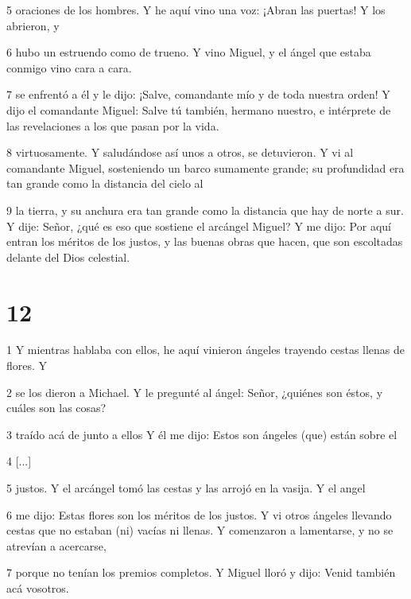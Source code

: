 \par 5 oraciones de los hombres. Y he aquí vino una voz: ¡Abran las puertas! Y los abrieron, y

\par 6 hubo un estruendo como de trueno. Y vino Miguel, y el ángel que estaba conmigo vino cara a cara.

\par 7 se enfrentó a él y le dijo: ¡Salve, comandante mío y de toda nuestra orden! Y dijo el comandante Miguel: Salve tú también, hermano nuestro, e intérprete de las revelaciones a los que pasan por la vida.

\par 8 virtuosamente. Y saludándose así unos a otros, se detuvieron. Y vi al comandante Miguel, sosteniendo un barco sumamente grande; su profundidad era tan grande como la distancia del cielo al

\par 9 la tierra, y su anchura era tan grande como la distancia que hay de norte a sur. Y dije: Señor, ¿qué es eso que sostiene el arcángel Miguel? Y me dijo: Por aquí entran los méritos de los justos, y las buenas obras que hacen, que son escoltadas delante del Dios celestial.

\chapter{12}

\par 1 Y mientras hablaba con ellos, he aquí vinieron ángeles trayendo cestas llenas de flores. Y

\par 2 se los dieron a Michael. Y le pregunté al ángel: Señor, ¿quiénes son éstos, y cuáles son las cosas?

\par 3 traído acá de junto a ellos Y él me dijo: Estos son ángeles (que) están sobre el

\par 4 [...]

\par 5 justos. Y el arcángel tomó las cestas y las arrojó en la vasija. Y el angel

\par 6 me dijo: Estas flores son los méritos de los justos. Y vi otros ángeles llevando cestas que no estaban (ni) vacías ni llenas. Y comenzaron a lamentarse, y no se atrevían a acercarse,

\par 7 porque no tenían los premios completos. Y Miguel lloró y dijo: Venid también acá vosotros.

